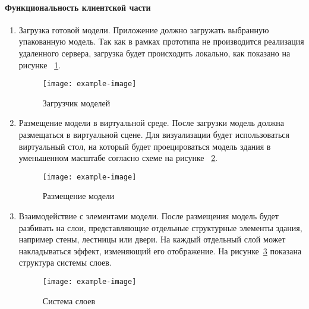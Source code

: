 \paragraph{Функциональность клиентской части}


\begin{enumerate}
    \item {
        Загрузка готовой модели.
        Приложение должно загружать выбранную упакованную модель.
        Так как в рамках прототипа не производится реализация удаленного сервера,
        загрузка будет происходить локально, как показано на рисунке~%
        \ref{figure:CModelLoader}.

        \begin{figure}[h]
            \centering
            \texttt{[image: example-image]}
            \caption{Загрузчик моделей}
            \label{figure:CModelLoader}
        \end{figure}

    } 
    \item {
        Размещение модели в виртуальной среде.
        После загрузки модель должна размещаться в виртуальной сцене.
        Для визуализации будет использоваться виртуальный стол,
        на который будет проецироваться модель здания
        в уменьшенном масштабе согласно схеме на рисунке~%
        \ref{figure:CStand}.

        \begin{figure}[h]
            \centering
            \texttt{[image: example-image]}
            \caption{Размещение модели}
            \label{figure:CStand}
        \end{figure}

    } 
    \item {
        Взаимодействие с элементами модели.
        После размещения модель будет разбивать на слои,
        представляющие отдельные структурные элементы здания,
        например стены, лестницы или двери.
        На каждый отдельный слой может накладываться эффект,
        изменяющий его отображение.
        На рисунке~\ref{figure:CLayers} показана
        структура системы слоев.

        \begin{figure}[h]
            \centering
            \texttt{[image: example-image]}
            \caption{Система слоев}
            \label{figure:CLayers}
        \end{figure}

    } 
\end{enumerate}


